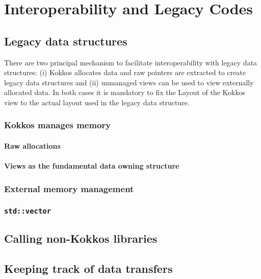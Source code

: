 \chapter{Interoperability and Legacy Codes}
\section{Legacy data structures}

There are two principal mechanism to facilitate interoperability with legacy data 
structures: (i) Kokkos allocates data and raw pointers are extracted to create 
legacy data structures and (ii) unmanaged views can be used to view externally 
allocated data. In both cases it is mandatory to fix the Layout of the Kokkos view
to the actual layout used in the legacy data structure.

\subsection{Kokkos manages memory}

\subsubsection{Raw allocations}
\subsubsection{Views as the fundamental data owning structure}


\subsection{External memory management}

\subsection{\lstinline|std::vector|}

\section{Calling non-Kokkos libraries}

\section{Keeping track of data transfers}

 

